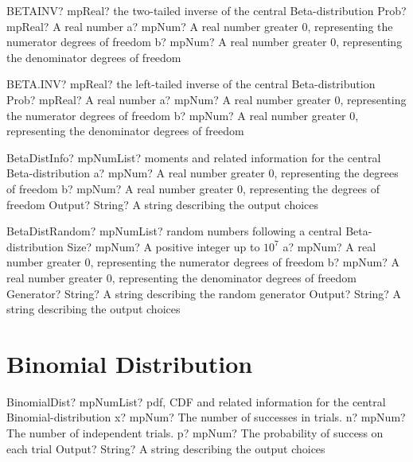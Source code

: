 \documentclass[12pt,a4paper,openany]{book}
\begin{document}
\begin{mpFunctionsExtract}
\mpWorksheetFunctionThree
{BETAINV? mpReal? the two-tailed inverse of the central Beta-distribution}
{Prob? mpReal? A real number}
{a? mpNum? A real number greater 0, representing the numerator  degrees of freedom}
{b? mpNum? A real number greater 0, representing the denominator degrees of freedom}
\end{mpFunctionsExtract}

\begin{mpFunctionsExtract}
\mpWorksheetFunctionThree
{BETA.INV? mpReal? the left-tailed inverse of the central Beta-distribution}
{Prob? mpReal? A real number}
{a? mpNum? A real number greater 0, representing the numerator  degrees of freedom}
{b? mpNum? A real number greater 0, representing the denominator degrees of freedom}
\end{mpFunctionsExtract}

\begin{mpFunctionsExtract}
\mpFunctionThreeNotImplemented
{BetaDistInfo? mpNumList? moments and related information for the central Beta-distribution}
{a? mpNum? A real number greater 0, representing the degrees of freedom}
{b? mpNum? A real number greater 0, representing the degrees of freedom}
{Output? String? A string describing the output choices}
\end{mpFunctionsExtract}

\begin{mpFunctionsExtract}
\mpFunctionFiveNotImplemented
{BetaDistRandom? mpNumList? random numbers following a central Beta-distribution}
{Size? mpNum? A positive integer up to $10^7$}
{a? mpNum? A real number greater 0, representing the numerator  degrees of freedom}
{b? mpNum? A real number greater 0, representing the denominator degrees of freedom}
{Generator? String? A string describing the random generator}
{Output? String? A string describing the output choices}
\end{mpFunctionsExtract}

\section{Binomial Distribution}

\begin{mpFunctionsExtract}
\mpFunctionFourNotImplemented
{BinomialDist? mpNumList? pdf, CDF and related information for the central Binomial-distribution}
{x? mpNum? The number of successes in trials.}
{n? mpNum? The number of independent trials.}
{p? mpNum? The probability of success on each trial}
{Output? String? A string describing the output choices}
\end{mpFunctionsExtract}
\end{document}

